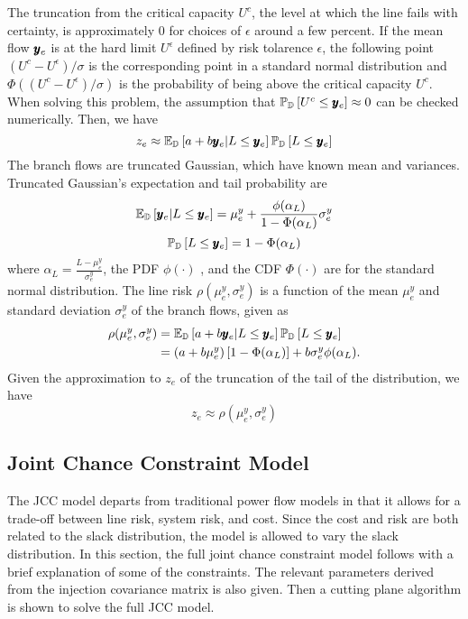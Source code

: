  The truncation from the critical capacity $U^c$, the level at which the line fails with certainty, is approximately 0 for choices of $\epsilon$ around a few percent.  If the mean flow $\pmb{y}_e$ is at the hard limit $U^{\epsilon}$ defined by risk tolarence $\epsilon$, the following point $ (U^c - U^{\epsilon} )/\sigma $ is the corresponding point in a standard normal distribution and $\Phi \left( (U^c - U^{\epsilon} )/\sigma \right)$ is the probability of being above the critical capacity $U^c$.  When solving this problem, the assumption that $\mathbb{P}_{\mathbb{D}} \left[  U^c \leq \pmb{y}_e  \right] \approx 0 $ can be checked numerically.  Then, we have
\[ z_e \approx \mathbb{E}_{\mathbb{D}} \left[  a+b\pmb{y}_e | L \leq \pmb{y}_e  \right] \mathbb{P}_{\mathbb{D}} \left[ L\leq \pmb{y}_e \right] \]
The branch flows are truncated Gaussian, which have known mean and variances. Truncated Gaussian's expectation and tail probability are
\[  \mathbb{E}_{\mathbb{D}} \left[  \pmb{y}_e | L \leq \pmb{y}_e  \right] = \mu^y_e + \frac{\phi( \alpha_L )}{ 1- \Phi(\alpha_L)} \sigma^y_e \]
\[ \mathbb{P}_{\mathbb{D}} \left[  L \leq \pmb{y}_e  \right] = 1 - \Phi(\alpha_L) \]
where $\alpha_L = \frac{L - \mu^y_e}{\sigma^y_e}$, the PDF $\phi(\cdot)$ , and the CDF $\Phi(\cdot)$ are for the standard normal distribution.  The line risk  $\rho(\mu^y_e, \sigma^y_e)$ is a function of the mean $\mu^y_e$  and standard deviation $\sigma^y_e$ of the branch flows, given as
\begin{align}\label{line_risk2}
\rho (\mu^y_e,\sigma^y_e) &= \mathbb{E}_{\mathbb{D}} \left[  a+b\pmb{y}_e | L \leq \pmb{y}_e  \right] \mathbb{P}_{\mathbb{D}} \left[ L\leq \pmb{y}_e \right] \\
&= (a + b \mu^y_e)\left[ 1 - \Phi(\alpha_L) \right]  + b \sigma^y_e \phi(\alpha_L) .
\end{align}
Given the approximation to $z_e$ of the truncation of the tail of the distribution, we have
\begin{equation}
z_e \approx \rho (\mu^y_e,\sigma^y_e)
\end{equation}








\subsection{Joint Chance Constraint Model}%
The JCC model departs from traditional power flow models in that it allows for a trade-off between line risk, system risk, and cost. Since the cost and risk are both related to the slack distribution, the model is allowed to vary the slack distribution.  In this section, the full joint chance constraint model follows with a brief explanation of some of the constraints.  The relevant parameters derived from the injection covariance matrix is also given.  Then a cutting plane algorithm is shown to solve the full JCC model.

